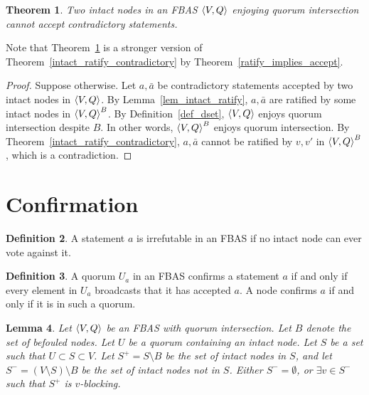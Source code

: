 \documentclass[12pt, psamsfonts]{amsart}
\newtheorem{thm}{Theorem}[section]
\newtheorem{lem}[thm]{Lemma}
\theoremstyle{definition}
\newtheorem{defn}[thm]{Definition}
\theoremstyle{remark}
\numberwithin{equation}{section}
\begin{document}
\begin{thm}\label{intact_accept_contradictory}
    Two intact nodes in an FBAS $\ev{V, Q}$ enjoying quorum intersection cannot accept contradictory statements.
\end{thm}

Note that Theorem~\ref{intact_accept_contradictory} is a stronger version of Theorem~\ref{intact_ratify_contradictory} by Theorem~\ref{ratify_implies_accept}.

\begin{proof}
    Suppose otherwise.
    Let $a, \bar{a}$ be contradictory statements accepted by two intact nodes in $\ev{V, Q}$.
    By Lemma~\ref{lem_intact_ratify}, $a, \bar{a}$ are ratified by some intact nodes in $\ev{V, Q}^B$.
    By Definition~\ref{def_dset}, $\ev{V, Q}$ enjoys quorum intersection despite $B$.
    In other words, $\ev{V, Q}^B$ enjoys quorum intersection.
    By Theorem~\ref{intact_ratify_contradictory}, $a, \bar{a}$ cannot be ratified by $v, v'$ in $\ev{V, Q}^B$, which is a contradiction.
\end{proof}

\section{Confirmation}

\begin{defn}\label{def_irrefutable}
    A statement $a$ is irrefutable in an FBAS if no intact node can ever vote against it.
\end{defn}

\begin{defn}\label{def_confirm}
    A quorum $U_a$ in an FBAS confirms a statement $a$ if and only if every element in $U_a$ broadcasts that it has accepted $a$.
    A node confirms $a$ if and only if it is in such a quorum.
\end{defn}

\begin{lem}\label{lemma_for_every_intact_node}
    Let $\ev{V, Q}$ be an FBAS with quorum intersection.
    Let $B$ denote the set of befouled nodes.
    Let $U$ be a quorum containing an intact node.
    Let $S$ be a set such that $U \subset S \subset V$.
    Let $S^{+} = S \setminus B$ be the set of intact nodes in $S$, and let $S^{-} = (V \setminus S) \setminus B$ be the set of intact nodes not in $S$.
    Either $S^{-} = \emptyset$, or $\exists v \in S^{-}$ such that $S^{+}$ is $v$-blocking.
\end{lem}
\end{document}
